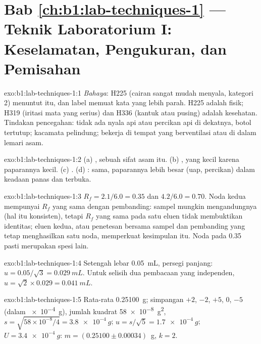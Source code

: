 \section*{Bab \ref{ch:b1:lab-techniques-1} --- Teknik Laboratorium I: Keselamatan, Pengukuran, dan Pemisahan}

\begin{solution}{exo:b1:lab-techniques-1:1}
\emph{Bahaya}: H225 (cairan sangat mudah menyala, kategori 2) menuntut
 itu, dan label memuat kata yang lebih parah. H225 adalah
 fisik; H319 (iritasi mata yang serius) dan H336 (kantuk atau
pusing) adalah  kesehatan. Tindakan pencegahan: tidak ada nyala api
atau percikan api di dekatnya, botol tertutup; kacamata pelindung;
bekerja di tempat yang berventilasi atau di dalam lemari asam.
\end{solution}

\begin{solution}{exo:b1:lab-techniques-1:2}
(a) , sebuah sifat asam itu. (b) , yang kecil karena
paparannya kecil. (c) . (d) :  sama, paparannya
lebih besar (uap, percikan) dalam keadaan panas dan terbuka.
\end{solution}

\begin{solution}{exo:b1:lab-techniques-1:3}
$R_f = 2.1/6.0 = 0.35$ dan $4.2/6.0 = 0.70$. Noda kedua mempunyai
$R_f$ yang sama dengan pembanding: sampel mungkin mengandungnya (hal itu
konsisten), tetapi $R_f$ yang sama pada satu eluen tidak membuktikan
identitas; eluen kedua, atau penetesan bersama sampel dan pembanding yang
tetap menghasilkan satu noda, memperkuat kesimpulan itu. Noda pada 0.35
pasti merupakan spesi lain.
\end{solution}

\begin{solution}{exo:b1:lab-techniques-1:4}
Setengah lebar \qty{0.05}{mL}, persegi panjang: $u = 0.05/\sqrt3 = \qty{0.029}{mL}$.
Untuk selisih dua pembacaan yang independen,
$u = \sqrt{2} \times 0.029 = \qty{0.041}{mL}$.
\end{solution}

\begin{solution}{exo:b1:lab-techniques-1:5}
Rata-rata \qty{0.25100}{g}; simpangan $+2$, $-2$, $+5$, 0, $-5$ (dalam
\qty{e-4}{g}), jumlah kuadrat \qty{58e-8}{g^2}, $s = \sqrt{58 \times
10^{-8}/4} = \qty{3.8e-4}{g}$; $u = s/\sqrt5 = \qty{1.7e-4}{g}$;
$U = \qty{3.4e-4}{g}$: $m = (0.25100 \pm 0.00034)$~g, $k = 2$.
\end{solution}

